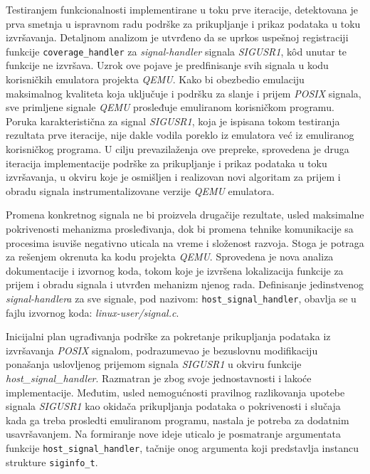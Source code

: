\documentclass[12pt,oneside]{memoir}
\newcommand{\kod}[1]{\texttt{#1}}
\newcommand{\strano}[1]{\textit{#1}}
\begin{document}
Testiranjem funkcionalnosti implementirane u toku prve iteracije, detektovana je prva smetnja u ispravnom radu podrške za prikupljanje i prikaz podataka u toku izvršavanja. Detaljnom analizom je utvrđeno da se uprkos uspešnoj registraciji funkcije \kod{coverage\_handler} za \strano{signal-handler} signala \strano{SIGUSR1}, k\^{o}d unutar te funkcije ne izvršava. Uzrok ove pojave je predfinisanje svih signala u kodu korisničkih emulatora projekta \strano{QEMU}. Kako bi obezbedio emulaciju maksimalnog kvaliteta koja uključuje i podršku za slanje i prijem \strano{POSIX} signala, sve primljene signale \strano{QEMU} prosleđuje emuliranom korisničkom programu. Poruka karakteristična za signal \strano{SIGUSR1}, koja je ispisana tokom testiranja rezultata prve iteracije, nije dakle vodila poreklo iz emulatora već iz emuliranog korisničkog programa. U cilju prevazilaženja ove prepreke, sprovedena je druga iteracija implementacije podrške za prikupljanje i prikaz podataka u toku izvršavanja, u okviru koje je osmišljen i realizovan novi algoritam za prijem i obradu signala instrumentalizovane verzije \strano{QEMU} emulatora. 

Promena konkretnog signala ne bi proizvela drugačije rezultate, usled maksimalne pokrivenosti mehanizma prosleđivanja, dok bi promena tehnike komunikacije sa procesima isuviše negativno uticala na vreme i složenost razvoja. Stoga je potraga za rešenjem okrenuta ka kodu projekta \strano{QEMU}. Sprovedena je nova analiza dokumentacije i izvornog koda, tokom koje je izvršena lokalizacija funkcije za prijem i obradu signala i utvrđen mehanizm njenog rada. Definisanje jedinstvenog \strano{signal-handlera} za sve signale, pod nazivom: \kod{host\_signal\_handler}, obavlja se u fajlu izvornog koda: \strano{linux-user/signal.c}. 

Inicijalni plan ugrađivanja podrške za pokretanje prikupljanja podataka iz izvršavanja \strano{POSIX} signalom, podrazumevao je bezuslovnu modifikaciju ponašanja uslovljenog prijemom signala \strano{SIGUSR1} u okviru funkcije \strano{host\_signal\_handler}. Razmatran je zbog svoje jednostavnosti i lakoće implementacije. Međutim, usled nemogućnosti pravilnog razlikovanja upotebe signala \strano{SIGUSR1} kao okidača prikupljanja podataka o pokrivenosti i slučaja kada ga treba prosledti emuliranom programu, nastala je potreba za dodatnim usavršavanjem. 
Na formiranje nove ideje uticalo je posmatranje argumentata funkcije \kod{host\_signal\_handler}, tačnije onog argumenta koji predstavlja instancu strukture \kod{siginfo\_t}. 
\end{document}
